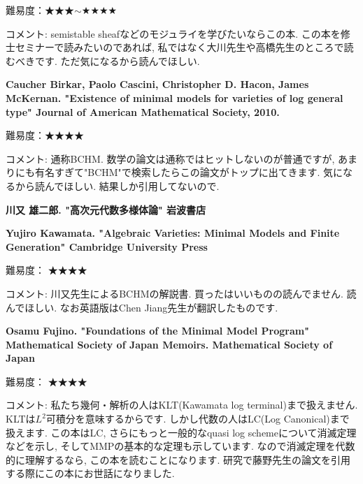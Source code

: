 難易度：★★★$\sim$★★★★\vspace{-6pt} 

コメント: semistable sheafなどのモジュライを学びたいならこの本. この本を修士セミナーで読みたいのであれば, 私ではなく大川先生や高橋先生のところで読むべきです. ただ気になるから読んでほしい.
 \vspace{8pt}
 
 \textbf{Caucher Birkar, Paolo Cascini, Christopher D. Hacon, James McKernan. "Existence of minimal models for varieties of log general type" Journal of American Mathematical Society, 2010.} \vspace{-6pt}

難易度：★★★★\vspace{-6pt} 

コメント: 通称BCHM. 数学の論文は通称ではヒットしないのが普通ですが, あまりにも有名すぎて"BCHM"で検索したらこの論文がトップに出てきます. 気になるから読んでほしい. 結果しか引用してないので. 
\vspace{8pt}

\textbf{川又 雄二郎. "高次元代数多様体論" 岩波書店} \vspace{-6pt}

\textbf{Yujiro Kawamata. "Algebraic Varieties: Minimal Models and Finite Generation" Cambridge University Press} \vspace{-6pt}

難易度： ★★★★\vspace{-6pt} 

コメント: 川又先生によるBCHMの解説書. 買ったはいいものの読んでません. 読んでほしい.
なお英語版はChen Jiang先生が翻訳したものです. 
\vspace{8pt}


\textbf{Osamu Fujino. "Foundations of the Minimal Model Program" Mathematical Society of Japan Memoirs. Mathematical Society of Japan} \vspace{-6pt}

難易度： ★★★★\vspace{-6pt} 

コメント: 私たち幾何・解析の人はKLT(Kawamata log terminal)まで扱えません. KLTは$L^2$可積分を意味するからです. しかし代数の人はLC(Log Canonical)まで扱えます. この本はLC, さらにもっと一般的なquasi log schemeについて消滅定理などを示し, そしてMMPの基本的な定理も示しています. 
なので消滅定理を代数的に理解するなら, この本を読むことになります. 
研究で藤野先生の論文を引用する際にこの本にお世話になりました. 


